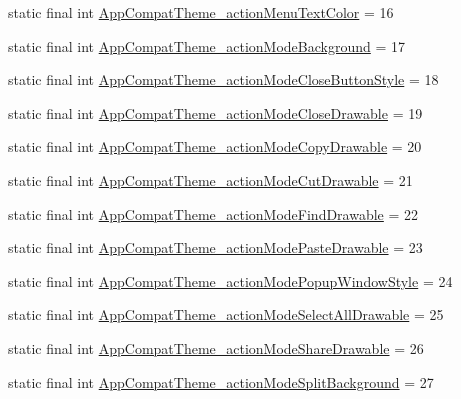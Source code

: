 \begin{DoxyCompactItemize}
\item 
static final int \mbox{\hyperlink{classandroid_1_1support_1_1design_1_1R_1_1styleable_a7826d96ee46d31f0fa72310dc6273682}{App\+Compat\+Theme\+\_\+action\+Menu\+Text\+Color}} = 16
\item 
static final int \mbox{\hyperlink{classandroid_1_1support_1_1design_1_1R_1_1styleable_a1b5697312f95195a23a9337e9a0b5083}{App\+Compat\+Theme\+\_\+action\+Mode\+Background}} = 17
\item 
static final int \mbox{\hyperlink{classandroid_1_1support_1_1design_1_1R_1_1styleable_a8418a1d6b947ad5f57f3a56af1643973}{App\+Compat\+Theme\+\_\+action\+Mode\+Close\+Button\+Style}} = 18
\item 
static final int \mbox{\hyperlink{classandroid_1_1support_1_1design_1_1R_1_1styleable_a0d23e6043c9a37971fa8a2c2167195f8}{App\+Compat\+Theme\+\_\+action\+Mode\+Close\+Drawable}} = 19
\item 
static final int \mbox{\hyperlink{classandroid_1_1support_1_1design_1_1R_1_1styleable_aa2e39cdddee1cff2cb530436fd7787eb}{App\+Compat\+Theme\+\_\+action\+Mode\+Copy\+Drawable}} = 20
\item 
static final int \mbox{\hyperlink{classandroid_1_1support_1_1design_1_1R_1_1styleable_a4f3e0ecd51b5084488b4e15613ca9248}{App\+Compat\+Theme\+\_\+action\+Mode\+Cut\+Drawable}} = 21
\item 
static final int \mbox{\hyperlink{classandroid_1_1support_1_1design_1_1R_1_1styleable_af9859e59c807eb94e56b365ea7fbe234}{App\+Compat\+Theme\+\_\+action\+Mode\+Find\+Drawable}} = 22
\item 
static final int \mbox{\hyperlink{classandroid_1_1support_1_1design_1_1R_1_1styleable_af8ee7e0434de26514fa36a0b93b0e321}{App\+Compat\+Theme\+\_\+action\+Mode\+Paste\+Drawable}} = 23
\item 
static final int \mbox{\hyperlink{classandroid_1_1support_1_1design_1_1R_1_1styleable_a7457a7662927f780df4d91b97e76dd3e}{App\+Compat\+Theme\+\_\+action\+Mode\+Popup\+Window\+Style}} = 24
\item 
static final int \mbox{\hyperlink{classandroid_1_1support_1_1design_1_1R_1_1styleable_a5899f63671a5851f68757ff8c89f11e4}{App\+Compat\+Theme\+\_\+action\+Mode\+Select\+All\+Drawable}} = 25
\item 
static final int \mbox{\hyperlink{classandroid_1_1support_1_1design_1_1R_1_1styleable_a4c5647081be9ed1ad46f91411d01c643}{App\+Compat\+Theme\+\_\+action\+Mode\+Share\+Drawable}} = 26
\item 
static final int \mbox{\hyperlink{classandroid_1_1support_1_1design_1_1R_1_1styleable_a002b6b7dd5b2a4e0bf171193481a7427}{App\+Compat\+Theme\+\_\+action\+Mode\+Split\+Background}} = 27

\end{DoxyCompactItemize}
